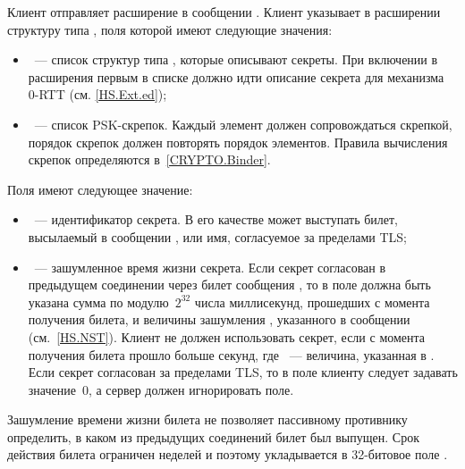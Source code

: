 Клиент отправляет расширение  в сообщении 
. Клиент указывает в расширении структуру типа 
, поля которой имеют следующие значения:

\begin{itemize}
\item
{}~--- список структур типа , которые 
описывают секреты. При включении в  расширения 
 первым в списке должно идти описание секрета для 
механизма 0-RTT (см. \ref{HS.Ext.ed});

\item
{}~--- список PSK-скрепок. Каждый элемент  должен 
сопровождаться скрепкой, порядок скрепок должен повторять порядок элементов.
Правила вычисления скрепок определяются в~\ref{CRYPTO.Binder}.
\end{itemize}

Поля  имеют следующее значение:

\begin{itemize}
\item
{}~--- идентификатор секрета. В его качестве может выступать 
билет, высылаемый в сообщении , или имя, 
согласуемое за пределами TLS;
\item
{}~--- зашумленное время жизни секрета. 
%
Если секрет согласован в предыдущем соединении через билет сообщения
, то в поле должна быть указана сумма по 
модулю~$2^{32}$ числа миллисекунд, прошедших с момента получения билета, 
и величины зашумления , указанного в сообщении 
(см.~\ref{HS.NST}). 
%
Клиент не должен использовать секрет, если с момента получения билета прошло 
больше  секунд, где ~--- величина, 
указанная в .
%
Если секрет согласован за пределами TLS, то в поле 
клиенту следует задавать значение~$0$, а сервер должен игнорировать поле.
\end{itemize}

\begin{note*}
Зашумление времени жизни билета не позволяет пассивному противнику определить, 
в каком из предыдущих соединений билет был выпущен.
%
Срок действия билета ограничен неделей и поэтому укладывается в 32-битовое 
поле .
\end{note*}

